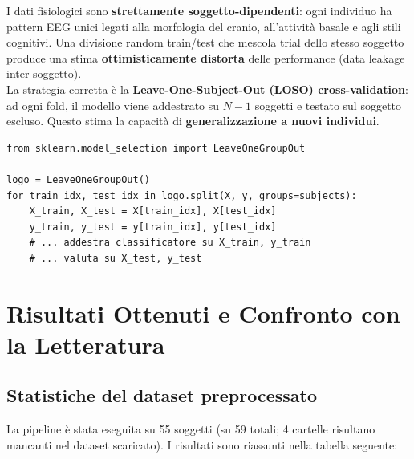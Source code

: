 \documentclass[12pt, a4paper]{article}
\begin{document}
\begin{notabox}
I dati fisiologici sono \textbf{strettamente soggetto-dipendenti}: ogni individuo ha pattern EEG unici legati alla morfologia del cranio, all'attività basale e agli stili cognitivi. Una divisione random train/test che mescola trial dello stesso soggetto produce una stima \textbf{ottimisticamente distorta} delle performance (data leakage inter-soggetto).\\[6pt]
La strategia corretta è la \textbf{Leave-One-Subject-Out (LOSO) cross-validation}: ad ogni fold, il modello viene addestrato su $N-1$ soggetti e testato sul soggetto escluso. Questo stima la capacità di \textbf{generalizzazione a nuovi individui}.
\end{notabox}

\begin{lstlisting}[caption={LOSO cross-validation con scikit-learn}]
from sklearn.model_selection import LeaveOneGroupOut

logo = LeaveOneGroupOut()
for train_idx, test_idx in logo.split(X, y, groups=subjects):
    X_train, X_test = X[train_idx], X[test_idx]
    y_train, y_test = y[train_idx], y[test_idx]
    # ... addestra classificatore su X_train, y_train
    # ... valuta su X_test, y_test
\end{lstlisting}

\section{Risultati Ottenuti e Confronto con la Letteratura}

\subsection{Statistiche del dataset preprocessato}

La pipeline è stata eseguita su 55 soggetti (su 59 totali; 4 cartelle risultano mancanti nel dataset scaricato). I risultati sono riassunti nella tabella seguente:
\end{document}
